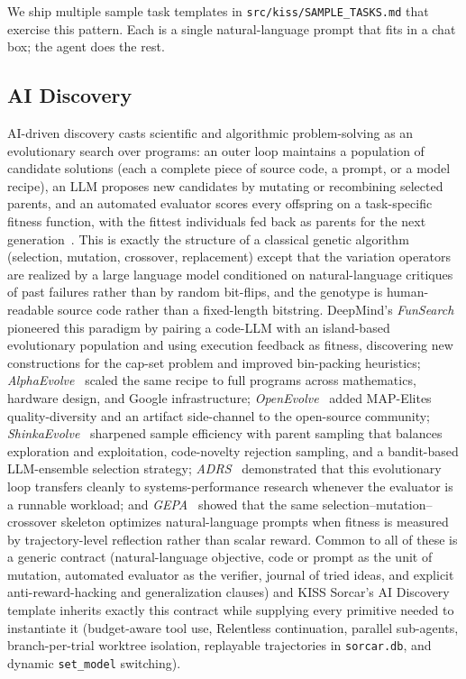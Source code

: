 \documentclass{article}
\begin{document}
We ship multiple sample task templates in \texttt{src/kiss/SAMPLE\_TASKS.md} that exercise this pattern.  Each is a single natural-language prompt that fits in a chat box; the agent does the rest.

\subsection{AI Discovery}
\label{sec:ai-discovery}

AI-driven discovery casts scientific and algorithmic problem-solving as an evolutionary search over programs: an outer loop maintains a population of candidate solutions (each a complete piece of source code, a prompt, or a model recipe), an LLM proposes new candidates by mutating or recombining selected parents, and an automated evaluator scores every offspring on a task-specific fitness function, with the fittest individuals fed back as parents for the next generation~\citep{romera2024funsearch,novikov2025alphaevolve,openevolve2025,lange2025shinka,cheng2025adrs,agrawal2025gepa}.  This is exactly the structure of a classical genetic algorithm (selection, mutation, crossover, replacement) except that the variation operators are realized by a large language model conditioned on natural-language critiques of past failures rather than by random bit-flips, and the genotype is human-readable source code rather than a fixed-length bitstring.  DeepMind's \emph{FunSearch}~\citep{romera2024funsearch} pioneered this paradigm by pairing a code-LLM with an island-based evolutionary population and using execution feedback as fitness, discovering new constructions for the cap-set problem and improved bin-packing heuristics; \emph{AlphaEvolve}~\citep{novikov2025alphaevolve} scaled the same recipe to full programs across mathematics, hardware design, and Google infrastructure; \emph{OpenEvolve}~\citep{openevolve2025} added MAP-Elites quality-diversity and an artifact side-channel to the open-source community; \emph{ShinkaEvolve}~\citep{lange2025shinka} sharpened sample efficiency with parent sampling that balances exploration and exploitation, code-novelty rejection sampling, and a bandit-based LLM-ensemble selection strategy; \emph{ADRS}~\citep{cheng2025adrs} demonstrated that this evolutionary loop transfers cleanly to systems-performance research whenever the evaluator is a runnable workload; and \emph{GEPA}~\citep{agrawal2025gepa} showed that the same selection--mutation--crossover skeleton optimizes natural-language prompts when fitness is measured by trajectory-level reflection rather than scalar reward.  Common to all of these is a generic contract (natural-language objective, code or prompt as the unit of mutation, automated evaluator as the verifier, journal of tried ideas, and explicit anti-reward-hacking and generalization clauses) and KISS Sorcar's AI Discovery template inherits exactly this contract while supplying every primitive needed to instantiate it (budget-aware tool use, Relentless continuation, parallel sub-agents, branch-per-trial worktree isolation, replayable trajectories in \texttt{sorcar.db}, and dynamic \texttt{set\_model} switching).
\end{document}
